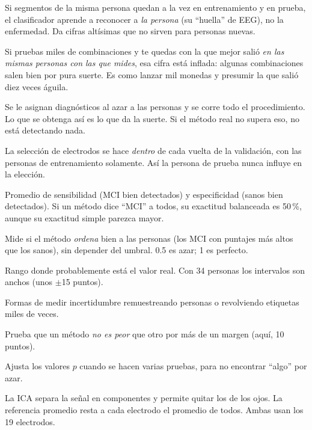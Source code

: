 \documentclass[11pt,letterpaper]{article}
\begin{document}
\begin{description}[style=nextline,leftmargin=0.4cm,itemsep=3pt]
\item[Fuga entre segmentos] Si segmentos de la misma persona quedan a la vez en entrenamiento y en prueba, el clasificador aprende a reconocer a \emph{la persona} (su ``huella'' de EEG), no la enfermedad. Da cifras altísimas que no sirven para personas nuevas.
\item[Sesgo de selección] Si pruebas miles de combinaciones y te quedas con la que mejor salió \emph{en las mismas personas con las que mides}, esa cifra está inflada: algunas combinaciones salen bien por pura suerte. Es como lanzar mil monedas y presumir la que salió diez veces águila.
\item[Etiquetas revueltas] Se le asignan diagnósticos al azar a las personas y se corre todo el procedimiento. Lo que se obtenga así es lo que da la suerte. Si el método real no supera eso, no está detectando nada.
\item[Validación anidada] La selección de electrodos se hace \emph{dentro} de cada vuelta de la validación, con las personas de entrenamiento solamente. Así la persona de prueba nunca influye en la elección.
\item[Exactitud balanceada] Promedio de sensibilidad (MCI bien detectados) y especificidad (sanos bien detectados). Si un método dice ``MCI'' a todos, su exactitud balanceada es 50\,\%, aunque su exactitud simple parezca mayor.
\item[AUC] Mide si el método \emph{ordena} bien a las personas (los MCI con puntajes más altos que los sanos), sin depender del umbral. 0.5 es azar; 1 es perfecto.
\item[Intervalo de confianza (IC)] Rango donde probablemente está el valor real. Con 34 personas los intervalos son anchos (unos $\pm$15 puntos).
\item[Bootstrap y permutaciones] Formas de medir incertidumbre remuestreando personas o revolviendo etiquetas miles de veces.
\item[No inferioridad] Prueba que un método \emph{no es peor} que otro por más de un margen (aquí, 10 puntos).
\item[Corrección de Holm] Ajusta los valores $p$ cuando se hacen varias pruebas, para no encontrar ``algo'' por azar.
\item[ICA y referencia promedio] La ICA separa la señal en componentes y permite quitar los de los ojos. La referencia promedio resta a cada electrodo el promedio de todos. Ambas usan los 19 electrodos.

\end{description}
\end{document}
